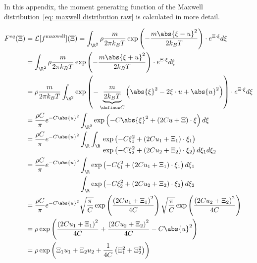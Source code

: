 In this appendix, the moment generating function of the Maxwell distribution~\eqref{eq: maxwell distribution raw} is calculated in more detail.

\begin{equation}
  \begin{aligned}
    F^{eq}(\Xi) & = \mathcal{L}[f^{\text{maxwell}}](\Xi)
    = \int_{\R^2} \rho \frac{m}{2\pi k_B T} \exp \left( - \frac{m\abs{\xi-u}^2}{2 k_B T}\right) \cdot e^{\Xi\cdot\xi} d\xi \\
    & = \int_{\R^2} \rho \frac{m}{2\pi k_B T} \exp \left( - \frac{m\abs{\xi+u}^2}{2 k_B T}\right) \cdot e^{\Xi\cdot\xi} d\xi \\
    & = \rho  \frac{m}{2\pi k_B T} \int_{\R^2}
      \exp \left( - \underbrace{\frac{m}{2 k_B T}}_{\defines C} \left( \abs{\xi}^2 - 2\xi\cdot u + \abs{u}^2 \right)\right) \cdot e^{\Xi\cdot\xi} d\xi \\
    & = \frac{\rho C} {\pi} e^{-C \abs{u}^2}
      \int_{\R^2}
      \exp \left( - C\abs{\xi}^2 + (2Cu + \Xi)\cdot\xi \right) d\xi \\
    & =  \frac{\rho C} {\pi} e^{-C \abs{u}^2}
      \int_{\R} \int_{\R}
      \begin{aligned}[t]
      &\exp \left( - C \xi_1^2 + (2Cu_1 + \Xi_1)\cdot\xi_1 \right) \\
      &\exp \left( - C\xi_2^2 + (2Cu_2 + \Xi_2)\cdot\xi_2 \right) d\xi_1 d\xi_2
      \end{aligned}\\
    & = \frac{\rho C} {\pi} e^{-C \abs{u}^2}
      \begin{aligned}[t]
        &\int_{\R}
        \exp \left( - C\xi_1^2 + (2Cu_1 + \Xi_1)\cdot\xi_1 \right) d\xi_1 \\
        &\int_{\R}
        \exp \left( - C\xi_2^2 + (2Cu_2 + \Xi_2)\cdot\xi_2 \right) d\xi_2
      \end{aligned}\\
    & = \frac{\rho C} {\pi} e^{-C \abs{u}^2}
      \sqrt{\frac{\pi}{C}}\exp \left( \frac{{(2Cu_1 + \Xi_1)}^2}{4C}\right)
      \sqrt{\frac{\pi}{C}}\exp \left( \frac{{(2Cu_2 + \Xi_2)}^2}{4C}\right) \\
    & = \rho
      \exp \left( \frac{{(2Cu_1 + \Xi_1)}^2}{4C} + \frac{{(2Cu_2 + \Xi_2)}^2}{4C} -C \abs{u}^2 \right) \\
    & = \rho
      \exp \left( \Xi_1 u_1 + \Xi_2 u_2 + \frac{1}{4C}\left(\Xi_1^2 + \Xi_2^2 \right)\right)
  \end{aligned}
\end{equation}
